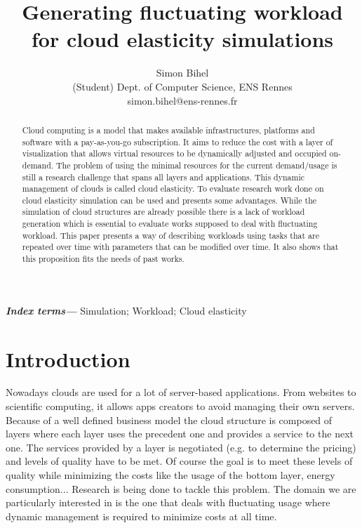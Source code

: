 \documentclass[a4paper, onecolumn]{article}
\title{Generating fluctuating workload for cloud elasticity simulations}
\author{Simon Bihel \\ (Student) Dept. of Computer Science, ENS Rennes\\
  simon.bihel@ens-rennes.fr}
\begin{document}
\maketitle

\begin{abstract}
  Cloud computing is a model that makes available infrastructures, platforms and
  software with a pay-as-you-go subscription. It aims to reduce the cost with a
  layer of visualization that allows virtual resources to be dynamically
  adjusted and occupied on-demand. The problem of using the minimal resources
  for the current demand/usage is still a research challenge that spans all
  layers and applications. This dynamic management of clouds is called cloud
  elasticity. To evaluate research work done on cloud elasticity simulation can 
  be used and presents some advantages. While the simulation of cloud 
  structures are already possible there is a lack of workload generation which 
  is essential to evaluate works supposed to deal with fluctuating workload. 
  This paper presents a way of describing workloads using tasks that are 
  repeated over time with parameters that can be modified over time. It also 
  shows that this proposition fits the needs of past works.
\end{abstract}

\providecommand{\keywords}[1]{\textbf{\textit{Index terms---}} #1}
\keywords{Simulation; Workload; Cloud elasticity}

\section{Introduction} \label{intro}
  Nowadays clouds are used for a lot of server-based applications. From websites
  to scientific computing, it allows apps creators to avoid managing their own
  servers. Because of a well defined business model the cloud structure is
  composed of layers where each layer uses the precedent one and provides a
  service to the next one. The services provided by a layer is negotiated (e.g.
  to determine the pricing) and levels of quality have to be met. Of course the
  goal is to meet these levels of quality while minimizing the costs like the
  usage of the bottom layer, energy consumption... Research is being done to
  tackle this problem. The domain we are particularly interested in is the one
  that deals with fluctuating usage where dynamic management is required to
  minimize costs at all time.
  
\end{document}
